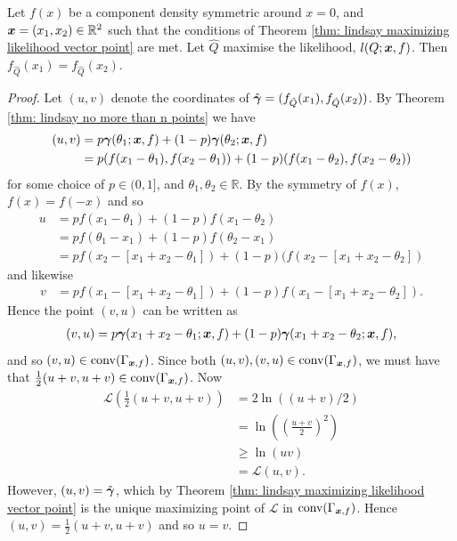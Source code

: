 		\begin{lemma}
		\label{lemma: maximizing point on line u = v}
			Let $f(x)$ be a component density symmetric around $x = 0$, and ${\bm{{x}}} = (x_1, x_2) \in \mathbb{R}^2$ such that the conditions of Theorem \ref{thm: lindsay maximizing likelihood vector point} are met. Let $\hat{Q}$ maximise the likelihood, $l(Q; {\bm{{x}}}, f)$. Then $f_{\hat{Q}}(x_1) = f_{\hat{Q}}(x_2)$.
		\end{lemma}
		\begin{proof}
			Let $(u, v)$ denote the coordinates of $\hat{{\bm{{\gamma}}}}  = (f_{\hat{Q}}(x_1), f_{\hat{Q}}(x_2))$. By Theorem \ref{thm: lindsay no more than n points} we have
			\begin{align}
				(u, v) &= p {\bm{{\gamma}}}(\theta_1; {\bm{{x}}}, f) + (1 - p) {\bm{{\gamma}}}(\theta_2;{\bm{{x}}}, f)\\
					&= p (f(x_1 - \theta_1), f(x_2 - \theta_1)) + (1 -p) (f(x_1 - \theta_2), f(x_2 - \theta_2))
			\end{align}
			for some choice of $p \in (0, 1]$, and $\theta_1, \theta_2 \in \mathbb{R}$. By the symmetry of $f(x)$, $f(x) = f(-x)$ and so
			\begin{align}
				u &= p f(x_1 - \theta_1) + (1 - p)f(x_1 - \theta_2)\\
					&= p f(\theta_1 - x_1) + (1 - p)f(\theta_2 - x_1)\\
					&= p f(x_2 - [x_1 + x_2 - \theta_1]) + (1 - p) (f(x_2 - [x_1 + x_2 - \theta_2])
			\end{align}
			and likewise
			\begin{align}
				v &= p f(x_1 - [x_1+x_2 - \theta_1]) + (1 - p) f(x_1 - [x_1 + x_2 - \theta_2]).
			\end{align}
			Hence the point $(v, u)$ can be written as
			\begin{align}
				(v, u) = p {\bm{{\gamma}}}(x_1 + x_2 - \theta_1;{\bm{{x}}}, f) + (1 - p) {\bm{{\gamma}}}(x_1 + x_2 - \theta_2;{\bm{{x}}}, f),
			\end{align}
			and so $(v, u) \in \mathrm{conv}(\Gamma_{{\bm{{x}}}, f})$.
			Since both $(u, v), (v, u) \in \mathrm{conv}(\Gamma_{{\bm{{x}}}, f})$, we must have that $\frac{1}{2}(u+v, u + v) \in \mathrm{conv}(\Gamma_{{\bm{{x}}}, f})$. Now
			\begin{align}
				\mathcal{L}\left(\frac{1}{2}(u+v, u + v)\right) &= 2\ln((u+v)/2)\\
					&= \ln\left(\left(\frac{u+v}{2}\right)^2\right)\\
					&\geq \ln(uv)\\
					&= \mathcal{L}(u,v).
			\end{align}
			However, $(u, v) = \hat{{\bm{{\gamma}}}}$, which by Theorem \ref{thm: lindsay maximizing likelihood vector point} is the unique maximizing point of $\mathcal{L}$ in $\mathrm{conv}(\Gamma_{{\bm{{x}}}, f})$. Hence $(u, v) = \frac{1}{2}(u+v, u+v)$ and so $u = v$.
		\end{proof}

